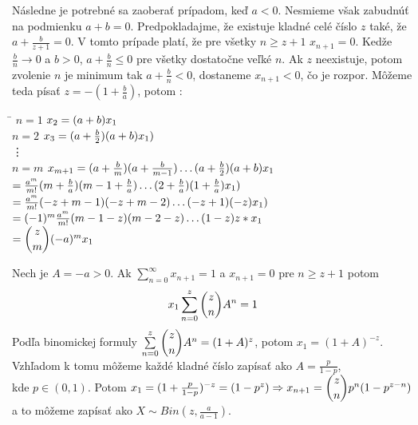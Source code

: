 \documentclass[a4paper,10pt]{article}
\theoremstyle{plain}
\theoremstyle{definition}
\begin{document}

Následne je potrebné sa zaoberať prípadom, keď $ a<0 $. Nesmieme však zabudnúť na podmienku $ a+b=0 $.
Predpokladajme, že existuje kladné celé číslo $ z $ také, že $ a + \frac{b}{z+1} = 0 $. V tomto prípade
platí, že pre všetky $ n\geq z+1  $ $ x_{n+1} = 0 $.
Kedže $ \frac{b}{n} \rightarrow 0$ a $ b>0 $, $a + \frac{b}{n} \leq 0$ pre všetky dostatočne veľké $ n $. Ak $ z $ neexistuje,
potom zvolenie $ n $ je minimum tak $ a+\frac{b}{n} <0$, dostaneme $ x_{n+1} <0 $, čo je rozpor.
Môžeme teda písať $ z = -(1+\frac{b}{a}) $, potom :
\begin{spacing}{1.6}
\begin{tabbing}
\hspace{1.5cm}\=\kill 
$ n=1 $ \> $x_{2}=(a+b)\*x_{1} $\\
$ n=2 $ \> $x_{3}=(a + \frac{b}{2}) \* (a + b)\*x_{1} ) $\\
 \> \vdots \\
$ n = m $ \> $ x_{m+1} = (a + \frac{b}{m})\*(a + \frac{b}{m-1})\ldots (a + \frac{b}{2})\*(a+b)\*x_{1}$\\
\> $= \frac{a^{m}}{m!}\*(m + \frac{b}{a})\*(m-1+\frac{b}{a}) \ldots (2+\frac{b}{a})\*(1+\frac{b}{a})\*x_{1}) $\\
\> $= \frac{a^{m}}{m!}\*(-z+m-1)\*(-z+m-2) \ldots (-z+1)\*(-z)\*x_{1}) $\\
\> $= (-1)^{m}\*\frac{a^{m}}{m!}\*(m-1-z)\*(m-2-z)\ldots(1-z)\*z*x_{1} $\\
\> $= \dbinom{z}{m}\*(-a)^{m}\*x_{1}  $\\
\end{tabbing} 
\end{spacing}
Nech je $ A = -a >0 $. Ak $ \sum\limits_{n=0}^\infty x_{n+1} = 1 $ a $ x_{n+1} = 0 $ pre $ n\geq z+1 $ potom 
	$$ x_{1} \sum\limits_{n=0}^z \dbinom{z}{n} A^{n}= 1 $$\newpage
Podľa binomickej formuly $ \sum\limits_{n=0}^z \dbinom{z}{n} A^{n}= (1+A)^{z} $, potom $ x_{1} = (1+A)^{-z} $.
Vzhľadom k tomu môžeme každé kladné číslo zapísať ako $ A = \frac{p}{1-p} $,\\ kde $ p \in (0,1) $. Potom
$ x_{1} = (1 + \frac{p}{1-p})^{-z} = (1-p^{z}) \Rightarrow x_{n+1} = \dbinom{z}{n}\*p^{n}\*(1-p^{z-n}) $ a to 
môžeme zapísať ako $ X \sim Bin(z,\frac{a}{a-1}) $.
\newpage
\end{document}
